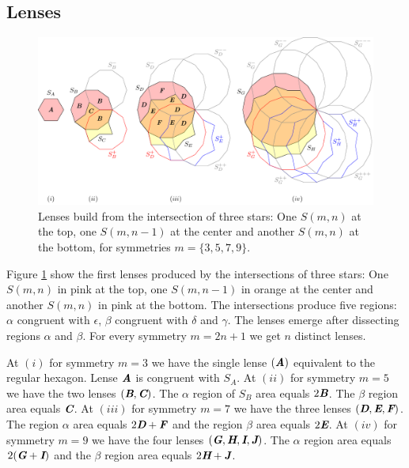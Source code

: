 \documentclass[11pt]{article}
\def\mathbi#1{\textbf{\em #1}}
\begin{document}
\subsection{Lenses}

\begin{figure}[H]
\centering
\includegraphics[scale=1]{stars/inter-a}
\caption{Lenses build from the intersection of three stars: One $S(m,n)$ at the top, one $S(m,n-1)$ at the center and another $S(m,n)$ at the bottom, for symmetries $m=\{3,5,7,9\}$.}
\label{fig:stars-inter-2}
\end{figure}

Figure \ref{fig:stars-inter-2} show the first lenses produced by the intersections of three stars: One $S(m,n)$ in pink at the top, one $S(m,n-1)$ in orange at the center and another $S(m,n)$ in pink at the bottom. The intersections produce five regions: $\alpha$ congruent with $\epsilon$, $\beta$ congruent with $\delta$ and $\gamma$. The lenses emerge after dissecting regions $\alpha$ and $\beta$. For every symmetry $m = 2n+1$ we get $n$ distinct lenses.

At $(i)$ for symmetry $m=3$ we have the single lense $(\mathbi{A})$ equivalent to the regular hexagon. Lense $\mathbi{A}$ is congruent with $S_A$.
At $(ii)$ for symmetry $m=5$ we have the two lenses $(\mathbi{B},\mathbi{C})$. The $\alpha$ region of $S_B$ area equals $2\mathbi{B}$. The $\beta$ region area equals $\mathbi{C}$.
At $(iii)$ for symmetry $m=7$ we have the three lenses $(\mathbi{D},\mathbi{E},\mathbi{F})$. The region $\alpha$ area equals $2\mathbi{D} + \mathbi{F}$ and the region $\beta$ area equals $2\mathbi{E}$.
At $(iv)$ for symmetry $m=9$ we have the four lenses $(\mathbi{G},\mathbi{H},\mathbi{I},\mathbi{J})$. The $\alpha$ region area equals $2(\mathbi{G}+\mathbi{I})$ and the $\beta$ region area equals $2\mathbi{H} + \mathbi{J}$.
\end{document}
